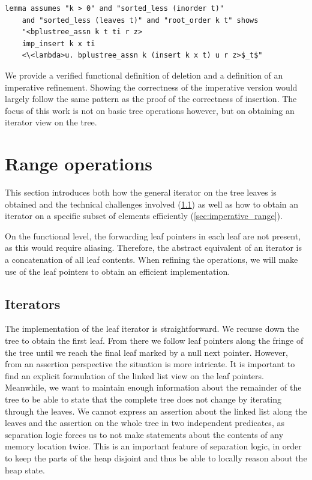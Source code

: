 \documentclass[a4paper,UKenglish,cleveref, cref, thm-restate]{lipics-v2021}
\begin{document}
\begin{lstlisting}[mathescape=true, language=Isabelle,label=lst:insert-refines]
lemma assumes "k > 0" and "sorted_less (inorder t)"
    and "sorted_less (leaves t)" and "root_order k t" shows
    "<bplustree_assn k t ti r z>
    imp_insert k x ti
    <\<lambda>u. bplustree_assn k (insert k x t) u r z>$_t$"
\end{lstlisting}
  

We provide a verified functional definition of deletion and a definition of an imperative refinement.
Showing the correctness of the imperative version would largely follow
the same pattern as the proof of the correctness of insertion.
The focus of this work is not on basic tree operations
however, but on obtaining an iterator view on the tree.


\section{Range operations}
\label{sec:range}

This section introduces both how the general iterator
on the tree leaves is obtained and the technical challenges involved
(\cref{sec:imperative_iter})
as well as how to obtain an iterator on a specific
subset of elements efficiently (\cref{sec:imperative_range}).

On the functional level, the forwarding leaf pointers in each leaf
are not present, as this would require aliasing.
Therefore, the abstract equivalent of an iterator
is a concatenation of all leaf contents.
When refining the operations, we will make use of the leaf pointers
to obtain an efficient implementation.

\subsection{Iterators}
\label{sec:imperative_iter}

The implementation of the leaf iterator is straightforward.
We recurse down the tree to obtain the first leaf.
From there we follow leaf
pointers along the fringe of the tree until we reach the final leaf marked by a null next pointer.
However, from an assertion perspective the situation is more intricate.
It is important to find an explicit formulation of the linked list view on the leaf pointers.
Meanwhile, we want to maintain enough information about the remainder of the tree
to be able to state that the complete tree does not change by iterating through the leaves.
We cannot express an assertion about the linked list along the leaves
and the assertion on the whole tree in two independent predicates,
as separation logic forces us to not make statements about the contents of
any memory location twice.
This is an important feature of separation logic,
in order to keep the parts of the heap disjoint and
thus be able to locally reason about the heap state.
\end{document}
